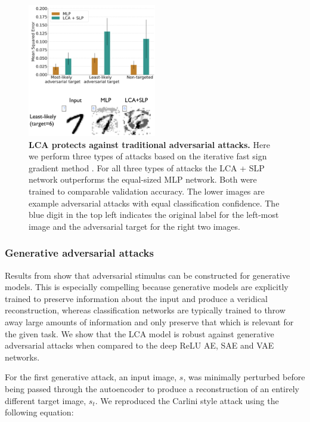 \begin{figure}
    \centering
    \includegraphics[width=0.5\textwidth]{figures/adversarial_mlp_lca_slp.png}
    \caption{\textbf{LCA protects against traditional adversarial attacks.} Here we perform three types of attacks based on the iterative fast sign gradient method \parencite{kurakin2016adversarial, kos2018adversarial}. For all three types of attacks the LCA + SLP network outperforms the equal-sized MLP network. Both were trained to comparable validation accuracy. The lower images are example adversarial attacks with equal classification confidence. The blue digit in the top left indicates the original label for the left-most image and the adversarial target for the right two images.}
    \label{fig:ch4_adversarial_mlp_vs_lca}
\end{figure}


\subsubsection{Generative adversarial attacks}
Results from \parencite{kos2018adversarial, gondim2018adversarial, goodfellow2014explaining} show that adversarial stimulus can be constructed for generative models. This is especially compelling because generative models are explicitly trained to preserve information about the input and produce a veridical reconstruction, whereas classification networks are typically trained to throw away large amounts of information and only preserve that which is relevant for the given task. We show that the LCA model is robust against generative adversarial attacks when compared to the deep ReLU AE, SAE \parencite{ng2011sparse} and VAE \parencite{kingma2013auto} networks.

For the first generative attack, an input image, $s$, was minimally perturbed before being passed through the autoencoder to produce a reconstruction of an entirely different target image, $s_{t}$. We reproduced the Carlini style attack \parencite{carlini2017towards, kos2018adversarial} using the following equation:

